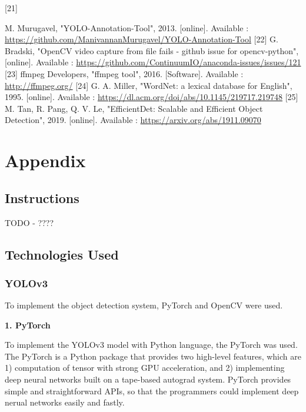 \documentclass{article}
\begin{document}
\newline
\hypertarget{ref21}{[21]} M. Murugavel, "YOLO-Annotation-Tool", 2013. [online]. Available :  \url{https://github.com/ManivannanMurugavel/YOLO-Annotation-Tool}
\newline
\hypertarget{ref22}{[22]} G. Bradski, "OpenCV video capture from file fails - github issue for opencv-python", [online]. Available : \url{https://github.com/ContinuumIO/anaconda-issues/issues/121}
\newline
\hypertarget{ref23}{[23]} ffmpeg Developers, "ffmpeg tool", 2016. [Software]. Available : \url{http://ffmpeg.org/}
\newline
\hypertarget{ref24}{[24]} G. A. Miller, "WordNet: a lexical database for English", 1995. [online]. Available : \url{https://dl.acm.org/doi/abs/10.1145/219717.219748}
\newline
\hypertarget{ref25}{[25]} M. Tan, R. Pang, Q. V. Le, "EfficientDet: Scalable and Efficient Object Detection", 2019. [online]. Available : \url{https://arxiv.org/abs/1911.09070}
\newline

\newpage

\section{Appendix}

\subsection{Instructions}

TODO - ????

\subsection{Technologies Used}

\subsubsection{YOLOv3}

To implement the object detection system, PyTorch and OpenCV were used.

\textbf{1. PyTorch}

To implement the YOLOv3 model with Python language, the PyTorch was used. The PyTorch is a Python package that provides two high-level features, which are 1) computation of tensor with strong GPU acceleration, and 2) implementing deep neural networks built on a tape-based autograd system. PyTorch provides simple and straightforward APIs, so that the programmers could implement deep nerual networks easily and fastly.
\end{document}
